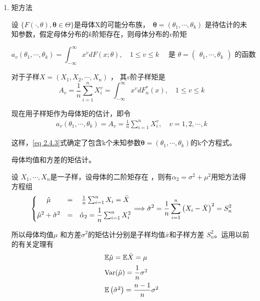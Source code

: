 	\begin{enumerate}[1)]
		\item 矩方法
		\setlength{\parindent}{2\ccwd}
		
        设 $ \{F(\cdot , \theta),  \boldsymbol{\theta} \in \Theta\} $是母体X的可能分布族，\
        $  \boldsymbol{\theta} = \left(\theta_{1}, \cdots, \theta_{k}\right) $ 是待估计的未知参数，假定母体分布的$ k $阶矩存在，则母体分布的$ v $阶矩
		
		\vspace{-1em}
		$$ a_{v}\left(\theta_{1}, \cdots, \theta_{k}\right)=\int_{-\infty}^{\infty} x^{v} d F(x ; \theta), \quad 1 \leqslant v \leqslant k
		\quad \text { 是 } \theta=\left(\begin{array}{ccc}
		\theta_{1},  \cdots,  \theta_{k}
		\end{array}\right) \text { 的函数 } $$
		
		对于子样$ X = (X_1, X_2 , \cdots ,X_n) $ ， 其$ v $阶子样矩是
		$$ A_{v}=\frac{1}{n} \sum_{i=1}^{n} X_{i}^{v}=\int_{-\infty}^{\infty} x^{v} d F_{n}^{*}(x), \quad 1 \leqslant v \leqslant k $$
		
		现在用子样矩作为母体矩的估计，即令
		\begin{eqnarray}
			a_{v}\left(\theta_{1}, \cdots, \theta_{k}\right)  =  A_{v}  =  \frac{1}{n} \sum_{i  = 1}^{n} X_{i}^{v}, \quad v  =  1,2, \cdots, k
			\label{eq 2.4.3}
		\end{eqnarray}
		
		这样，\eqref{eq 2.4.3}式确定了包含k个未知参数$  \boldsymbol{\theta}=\left(\theta_{1}, \cdots, \theta_{k}\right) $的k个方程式。
		
		\begin{myexample} 
			 母体均值和方差的矩估计。
		\end{myexample}
		设 $ X_{1}, \cdots, X_{n} $是一子样，设母体的二阶矩存在 ，则有$ \alpha_{2}=\sigma^{2}+\mu^{2} $用矩方法得方程组
		$$ \left\{\begin{matrix}
			\hat{\mu} & = &\frac{1}{n} \sum_{i=1}^{n} X_{i}=\bar{X}  \vspace{0.5em} \\
			\hat{\mu}^{2}+\hat{\sigma}^{2} & = & \hat{\alpha}_{2}=\dfrac{1}{n} \sum_{i=1}^{n} X_{i}^{2}
		\end{matrix}\right. \Longrightarrow 
		\hat{\sigma}^{2}=\dfrac{1}{n} \sum_{i=1}^{n}\left(X_{i}-\bar{X}\right)^{2}=S_{n}^{2} $$
		
		所以母体均值$ \mu $ 和方差$ \sigma^2 $的矩估计分别是子样均值$ \bar{x} $和子样方差 $ S_{n}^{2} $。运用以前的有关定理有
		$$ \begin{array}{l}
			    \mathbb{E} \hat{\mu}=\mathbb{E} \bar{X}=\mu  \vspace{0.5em}  \\
				\operatorname{Var}(\hat{\mu})=\dfrac{1}{n} \sigma^{2}  \vspace{0.5em}  \\
				\mathbb{E} \left(\hat{\sigma}^{2}\right)=\dfrac{n-1}{n} \sigma^{2}
		   \end{array} $$
		

\end{enumerate}
